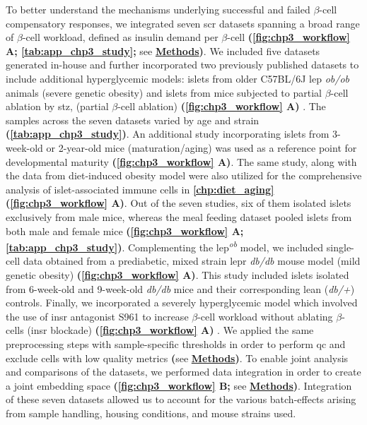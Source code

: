\par To better understand the mechanisms underlying successful and failed $\beta$-cell compensatory responses, we integrated seven \gls{scr} datasets spanning a broad range of $\beta$-cell workload, defined as insulin demand per $\beta$-cell \textbf{(\autoref{fig:chp3_workflow} A; \autoref{tab:app_chp3_study};} see \hyperref[subsubsec:met_chp3_data]{\textbf{Methods}}\textbf{)}. We included five datasets generated in-house and further incorporated two previously published datasets to include additional hyperglycemic models: islets from older C57BL/6J \gls{lep} \textit{ob/ob} animals (severe genetic obesity) and islets from mice subjected to partial $\beta$-cell ablation by \gls{stz}, (partial $\beta$-cell ablation) \textbf{(\autoref{fig:chp3_workflow} A)} \textbf{\cite{chung_endocrine-exocrine_2020,sachs_targeted_2020}}. The samples across the seven datasets varied by age and strain \textbf{(\autoref{tab:app_chp3_study})}. An additional study incorporating islets from 3-week-old or 2-year-old mice (maturation/aging) was used as a reference point for developmental maturity \textbf{(\autoref{fig:chp3_workflow} A)}. The same study, along with the data from diet-induced obesity model were also utilized for the comprehensive analysis of islet-associated immune cells in \textbf{\autoref{chp:diet_aging}} \textbf{(\autoref{fig:chp3_workflow} A)}. Out of the seven studies, six of them isolated islets exclusively from male mice, whereas the meal feeding dataset pooled islets from both male and female mice \textbf{(\autoref{fig:chp3_workflow} A; \autoref{tab:app_chp3_study})}. Complementing the \gls{lep}\textsuperscript{\textit{ob}} model, we included single-cell data obtained from a prediabetic, mixed strain \gls{lepr} \textit{db/db} mouse model (mild genetic obesity) \textbf{(\autoref{fig:chp3_workflow} A)}. This study included islets isolated from 6-week-old and 9-week-old \textit{db/db} mice and their corresponding lean (\textit{db/+}) controls. Finally, we incorporated a severely hyperglycemic model which involved the use of \gls{insr} antagonist S961 to increase $\beta$-cell workload without ablating $\beta$-cells (\gls{insr} blockade) \textbf{(\autoref{fig:chp3_workflow} A)} \textbf{\cite{wortham_metabolic_2024}}. We applied the same preprocessing steps with sample-specific thresholds in order to perform \gls{qc} and exclude cells with low quality metrics \textbf{(}see \hyperref[subsubsec:met_chp3_preprocessing]{\textbf{Methods}}\textbf{)}. To enable joint analysis and comparisons of the datasets, we performed data integration in order to create a joint embedding space \textbf{(\autoref{fig:chp3_workflow} B;} see \hyperref[subsubsec:met_chp3_integration]{\textbf{Methods}}\textbf{)}. Integration of these seven datasets allowed us to account for the various batch-effects arising from sample handling, housing conditions, and mouse strains used.\\



